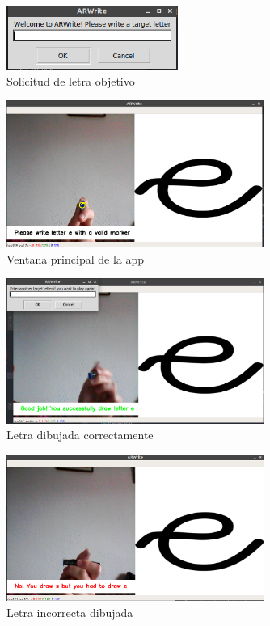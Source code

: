 \documentclass[12pt,spanish]{article}
\begin{document}
\begin{figure}[H]
	\centering
	\includegraphics[width=0.5\textwidth]{inputletter.png}
	\caption{Solicitud de letra objetivo}
\end{figure}
\begin{figure}[H]
	\centering
	\includegraphics[width=0.75\textwidth]{app1.png}
	\caption{Ventana principal de la app}
\end{figure}

\begin{figure}[H]
	\centering
	\includegraphics[width=0.75\textwidth]{letter_ok.png}
	\caption{Letra dibujada correctamente}
\end{figure}

\begin{figure}[H]
	\centering
	\includegraphics[width=0.75\textwidth]{wrong_letter.png}
	\caption{Letra incorrecta dibujada}
\end{figure}
\end{document}

